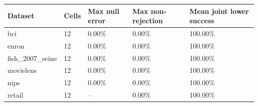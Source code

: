 \begin{tabular}{lllll}
\toprule
Dataset & Cells & Max null error & Max non-rejection & Mean joint lower success \\
\midrule
bci & 12 & 0.00\% & 0.00\% & 100.00\% \\
enron & 12 & 0.00\% & 0.00\% & 100.00\% \\
fish\_2007\_seine & 12 & 0.00\% & 0.00\% & 100.00\% \\
movielens & 12 & 0.00\% & 0.00\% & 100.00\% \\
nips & 12 & 0.00\% & 0.00\% & 100.00\% \\
retail & 12 & -- & 0.00\% & 100.00\% \\
\bottomrule
\end{tabular}
